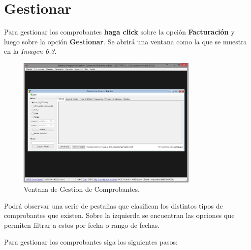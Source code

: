 \documentclass{book}
\begin{document}
\section{Gestionar}

Para gestionar los comprobantes \textbf{haga click} sobre la opción \textbf{Facturación} y luego sobre la opción \textbf{Gestionar}. Se abrirá una ventana como la que se muestra en la \textit{Imagen 6.3}.
\smallskip

\begin{figure}[H]
	\centering
	\includegraphics[width=0.79\textwidth]{images/ventanas/ventana-11.jpg}
	\caption{Ventana de Gestion de Comprobantes.}
	\medskip
\end{figure}
\bigskip


Podrá observar una serie de pestañas que clasifican los distintos tipos de comprobantes que existen. Sobre la izquierda se encuentran las opciones que permiten filtrar a estos por fecha o rango de fechas.
\par
Para gestionar los comprobantes siga los siguientes pasos:
\end{document}
